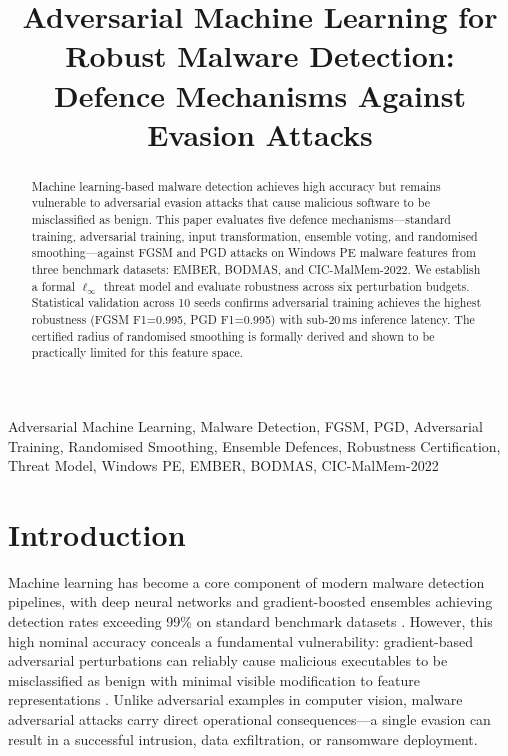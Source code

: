 \documentclass[conference]{IEEEtran}
\title{Adversarial Machine Learning for Robust Malware Detection:\\
Defence Mechanisms Against Evasion Attacks}
\author{
\IEEEauthorblockN{Student Author}
\IEEEauthorblockA{x00000000\\
H9AIMLC -- AI/ML in Cybersecurity\\
National College of Ireland\\
Dublin, Ireland}
}
\begin{document}
\maketitle

\begin{abstract}
Machine learning-based malware detection achieves high accuracy but remains vulnerable to adversarial evasion attacks that cause malicious software to be misclassified as benign. This paper evaluates five defence mechanisms---standard training, adversarial training, input transformation, ensemble voting, and randomised smoothing---against FGSM and PGD attacks on Windows PE malware features from three benchmark datasets: EMBER, BODMAS, and CIC-MalMem-2022. We establish a formal $\ell_\infty$ threat model and evaluate robustness across six perturbation budgets. Statistical validation across 10 seeds confirms adversarial training achieves the highest robustness (FGSM F1=0.995, PGD F1=0.995) with sub-20\,ms inference latency. The certified radius of randomised smoothing is formally derived and shown to be practically limited for this feature space.
\end{abstract}

\begin{IEEEkeywords}
Adversarial Machine Learning, Malware Detection, FGSM, PGD, Adversarial Training, Randomised Smoothing, Ensemble Defences, Robustness Certification, Threat Model, Windows PE, EMBER, BODMAS, CIC-MalMem-2022
\end{IEEEkeywords}

\section{Introduction}

Machine learning has become a core component of modern malware detection pipelines, with deep neural networks \cite{lecun2015} and gradient-boosted ensembles achieving detection rates exceeding 99\% on standard benchmark datasets \cite{anderson2018,yang2021}. However, this high nominal accuracy conceals a fundamental vulnerability: gradient-based adversarial perturbations can reliably cause malicious executables to be misclassified as benign with minimal visible modification to feature representations \cite{szegedy2014,goodfellow2015}. Unlike adversarial examples in computer vision, malware adversarial attacks carry direct operational consequences---a single evasion can result in a successful intrusion, data exfiltration, or ransomware deployment.
\end{document}
